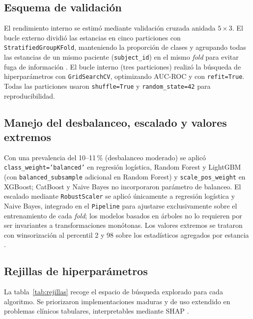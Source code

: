 \documentclass[
  spanish,
  a4paper,
  12pt,
  twoside]{memoir}
\begin{document}
\subsection*{Esquema de validación}

El rendimiento interno se estimó mediante validación cruzada anidada $5\times3$. El bucle externo dividió las estancias en cinco particiones con
\texttt{StratifiedGroupKFold}, manteniendo la proporción de clases y agrupando todas las estancias de un mismo paciente (\texttt{subject\_id}) en el mismo
\emph{fold} para evitar fuga de información \cite{kamran2024}. El bucle interno (tres particiones) realizó la búsqueda de hiperparámetros con \texttt{GridSearchCV},
optimizando AUC-ROC y con \texttt{refit=True}. Todas las particiones usaron \texttt{shuffle=True} y \texttt{random\_state=42} para reproducibilidad.

\subsection*{Manejo del desbalanceo, escalado y valores extremos}

Con una prevalencia del 10--11\,\% (desbalanceo moderado) se aplicó \texttt{class\_weight='balanced'} en regresión logística, Random Forest y
LightGBM (con \texttt{balanced\_subsample} adicional en Random Forest) y \texttt{scale\_pos\_weight} en XGBoost; CatBoost y Naive Bayes no incorporaron
parámetro de balanceo. El escalado mediante \texttt{RobustScaler} se aplicó únicamente a regresión logística y Naive Bayes, integrado en el
\texttt{Pipeline} para ajustarse exclusivamente sobre el entrenamiento de cada \emph{fold}; los modelos basados en árboles no lo requieren por ser invariantes
a transformaciones monótonas. Los valores extremos se trataron con winsorización al percentil 2 y 98 sobre los estadísticos agregados por estancia \cite{gupta2022mimic}.

\subsection*{Rejillas de hiperparámetros}

La tabla~\ref{tab:rejillas} recoge el espacio de búsqueda explorado para cada algoritmo. Se priorizaron implementaciones maduras y de uso extendido en
problemas clínicos tabulares, interpretables mediante SHAP \cite{lundberg2017}.
\end{document}
